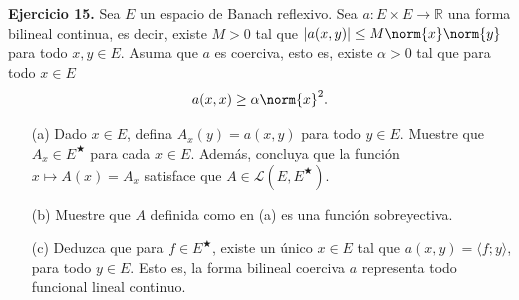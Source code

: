 

\textbf{Ejercicio 15.} Sea $E$ un espacio de Banach reflexivo. Sea $a:E\times E\to \mathbb{R}$ una forma bilineal continua, es decir, existe $M>0$ tal que $|a(x,y)|\leq M\norm{x}\norm{y}$ para todo $x,y \in E$. Asuma que $a$ es coerciva, esto es, existe $\alpha>0$ tal que para todo $x \in E$
\begin{align*}
    a(x,x)\geq \alpha\norm{x}^2.
\end{align*}
\begin{enumerate}
    \item[(a)] Dado $x \in E$, defina $A_x(y)=a(x,y)$ para todo $y \in E$. Muestre que $A_x\in E^\bigstar$ para cada $x \in E$. Además, concluya que la función $x\mapsto A(x)=A_x$ satisface que $A\in \mathcal{L}(E,E^\bigstar)$.
    \item[(b)] Muestre que $A$ definida como en (a) es una función sobreyectiva.
    \item[(c)] Deduzca que para $f \in E^\bigstar$, existe un único $x \in E$ tal que $a(x,y)=\langle f;y\rangle$, para todo $y \in E$. Esto es, la forma bilineal coerciva $a$ representa todo funcional lineal continuo.
\end{enumerate}



